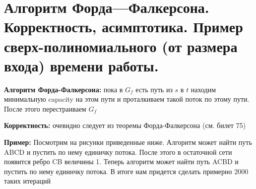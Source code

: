 \setcounter{section}{75}
\section{Алгоритм Форда—Фалкерсона. Корректность, асимптотика. Пример сверх-полиномиального (от размера входа) времени работы.}
\par \textbf{Алгоритм Форда-Фалкерсона:} пока в $G_f$ есть путь из $s$ в $t$ находим минимальную capacity на этом пути и проталкиваем такой поток по этому пути. После этого перестраиваем $G_f$
\par \textbf{Корректность:} очевидно следует из теоремы Форда-Фалкерсона (см. билет 75)
\par \textbf{Пример:} Посмотрим на рисунки приведенные ниже. Алгоритм может найти путь ABCD и пустить по нему единичку потока. После этого в остаточной сети появится ребро CB величины 1. Теперь алгоритм может найти путь ACBD и пустить по нему едиинчку потока. В итоге нам придется сделать примерно $2000$ таких итераций
